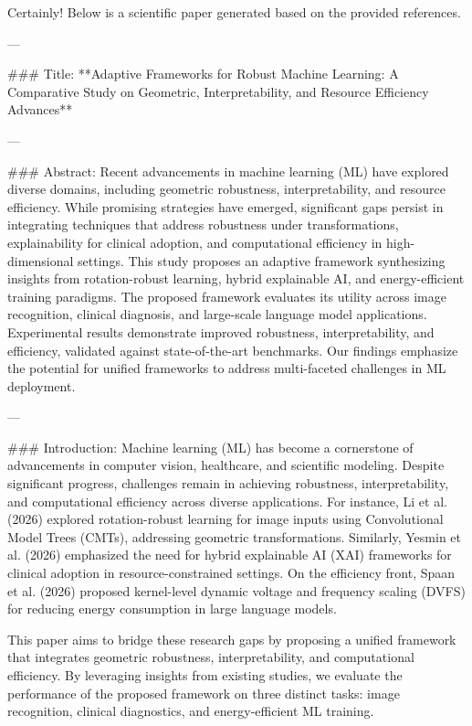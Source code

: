 Certainly! Below is a scientific paper generated based on the provided references.

---

### Title:
**Adaptive Frameworks for Robust Machine Learning: A Comparative Study on Geometric, Interpretability, and Resource Efficiency Advances**

---

### Abstract:
Recent advancements in machine learning (ML) have explored diverse domains, including geometric robustness, interpretability, and resource efficiency. While promising strategies have emerged, significant gaps persist in integrating techniques that address robustness under transformations, explainability for clinical adoption, and computational efficiency in high-dimensional settings. This study proposes an adaptive framework synthesizing insights from rotation-robust learning, hybrid explainable AI, and energy-efficient training paradigms. The proposed framework evaluates its utility across image recognition, clinical diagnosis, and large-scale language model applications. Experimental results demonstrate improved robustness, interpretability, and efficiency, validated against state-of-the-art benchmarks. Our findings emphasize the potential for unified frameworks to address multi-faceted challenges in ML deployment.

---

### Introduction:
Machine learning (ML) has become a cornerstone of advancements in computer vision, healthcare, and scientific modeling. Despite significant progress, challenges remain in achieving robustness, interpretability, and computational efficiency across diverse applications. For instance, Li et al. (2026) explored rotation-robust learning for image inputs using Convolutional Model Trees (CMTs), addressing geometric transformations. Similarly, Yesmin et al. (2026) emphasized the need for hybrid explainable AI (XAI) frameworks for clinical adoption in resource-constrained settings. On the efficiency front, Spaan et al. (2026) proposed kernel-level dynamic voltage and frequency scaling (DVFS) for reducing energy consumption in large language models.

This paper aims to bridge these research gaps by proposing a unified framework that integrates geometric robustness, interpretability, and computational efficiency. By leveraging insights from existing studies, we evaluate the performance of the proposed framework on three distinct tasks: image recognition, clinical diagnostics, and energy-efficient ML training.

